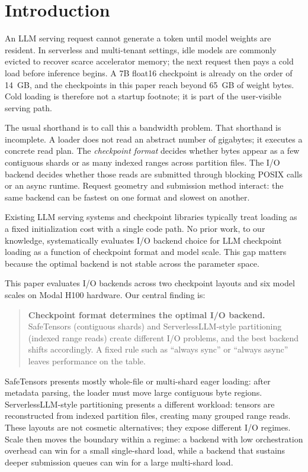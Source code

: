 \section{Introduction}
\label{sec:introduction}

An LLM serving request cannot generate a token until model weights are resident. In serverless and multi-tenant settings, idle models are commonly evicted to recover scarce accelerator memory; the next request then pays a cold load before inference begins. A 7B float16 checkpoint is already on the order of 14~GB, and the checkpoints in this paper reach beyond 65~GB of weight bytes. Cold loading is therefore not a startup footnote; it is part of the user-visible serving path.

The usual shorthand is to call this a bandwidth problem. That shorthand is incomplete. A loader does not read an abstract number of gigabytes; it executes a concrete read plan. The \emph{checkpoint format} decides whether bytes appear as a few contiguous shards or as many indexed ranges across partition files. The I/O backend decides whether those reads are submitted through blocking POSIX calls or an async runtime. Request geometry and submission method interact: the same backend can be fastest on one format and slowest on another.

Existing LLM serving systems and checkpoint libraries typically treat loading as a fixed initialization cost with a single code path. No prior work, to our knowledge, systematically evaluates I/O backend choice for LLM checkpoint loading as a function of checkpoint format and model scale. This gap matters because the optimal backend is not stable across the parameter space.

This paper evaluates I/O backends across two checkpoint layouts and six model scales on Modal H100 hardware. Our central finding is:

\begin{quote}
\textbf{Checkpoint format determines the optimal I/O backend.} SafeTensors (contiguous shards) and ServerlessLLM-style partitioning (indexed range reads) create different I/O problems, and the best backend shifts accordingly. A fixed rule such as ``always sync'' or ``always async'' leaves performance on the table.
\end{quote}

SafeTensors presents mostly whole-file or multi-shard eager loading: after metadata parsing, the loader must move large contiguous byte regions. ServerlessLLM-style partitioning presents a different workload: tensors are reconstructed from indexed partition files, creating many grouped range reads. These layouts are not cosmetic alternatives; they expose different I/O regimes. Scale then moves the boundary within a regime: a backend with low orchestration overhead can win for a small single-shard load, while a backend that sustains deeper submission queues can win for a large multi-shard load.

